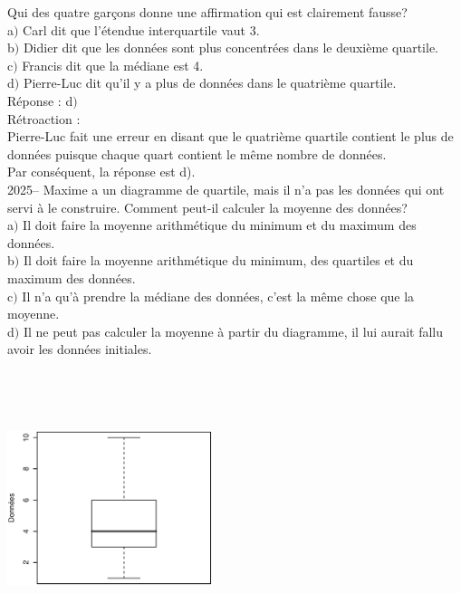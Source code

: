 \documentclass[letterpaper, 12pt]{article}
\begin{document}
Qui des quatre gar\c cons donne une affirmation qui est clairement fausse?\\

a$)$ Carl dit que l'\'etendue interquartile vaut 3. \\
b$)$ Didier dit que les donn\'ees sont plus concentr\'ees dans le deuxi\`eme quartile.\\
c$)$ Francis dit que la m\'ediane est 4.\\
d$)$ Pierre-Luc dit qu'il y a plus de donn\'ees dans le quatri\`eme quartile. \\

R\'eponse : d$)$\\

R\'etroaction :\\
Pierre-Luc fait une erreur en disant que le quatri\`eme quartile contient le plus de donn\'ees puisque chaque quart contient le m\^eme nombre de donn\'ees. \\
Par cons\'equent, la r\'eponse est d).\\

2025-- Maxime a un diagramme de quartile, mais il n'a pas les donn\'ees qui ont servi \`a le construire. Comment peut-il calculer la moyenne des donn\'ees?\\

a$)$ Il doit faire la moyenne arithm\'etique du minimum et du maximum des donn\'ees. \\
b$)$ Il doit faire la moyenne arithm\'etique du minimum, des quartiles et du maximum des donn\'ees. \\
c$)$ Il n'a qu'\`a prendre la m\'ediane des donn\'ees, c'est la m\^eme chose que la moyenne.\\
d$)$ Il ne peut pas calculer la moyenne \`a partir du diagramme, il lui aurait fallu avoir les donn\'ees initiales.\\
\begin{center}
 \includegraphics[width=6cm,height=8cm,angle=-90]{Q2024.eps}
\end{center}
\end{document}
